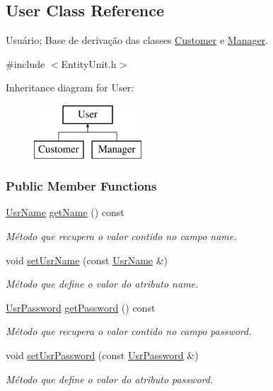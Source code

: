 \hypertarget{classUser}{\subsection{User Class Reference}
\label{d9/dc0/classUser}
}


Usuário; Base de derivação das classes \hyperlink{classCustomer}{Customer} e \hyperlink{classManager}{Manager}.  




{\ttfamily \#include $<$Entity\-Unit.\-h$>$}

Inheritance diagram for User\-:\begin{figure}[H]
\begin{center}
\leavevmode
\includegraphics[height=2.000000cm]{d9/dc0/classUser}
\end{center}
\end{figure}
\subsubsection*{Public Member Functions}
\begin{DoxyCompactItemize}
\item 
\hyperlink{classUsrName}{Usr\-Name} \hyperlink{classUser_ae1dd9bb1a02ea1aa4246da19c28cd831}{get\-Name} () const 
\begin{DoxyCompactList}\small\item\em Método que recupera o valor contido no campo name. \end{DoxyCompactList}\item 
void \hyperlink{classUser_ac20aab332b1debfd3b94aa4fb7825b07}{set\-Usr\-Name} (const \hyperlink{classUsrName}{Usr\-Name} \&)
\begin{DoxyCompactList}\small\item\em Método que define o valor do atributo name. \end{DoxyCompactList}\item 
\hyperlink{classUsrPassword}{Usr\-Password} \hyperlink{classUser_a799c61fc6ff206a1b1edbc86d61989ed}{get\-Password} () const 
\begin{DoxyCompactList}\small\item\em Método que recupera o valor contido no campo password. \end{DoxyCompactList}\item 
void \hyperlink{classUser_ad36ece3d4decfd7f3db7f15c96eec99b}{set\-Usr\-Password} (const \hyperlink{classUsrPassword}{Usr\-Password} \&)
\begin{DoxyCompactList}\small\item\em Método que define o valor do atributo password. \end{DoxyCompactList}\end{DoxyCompactItemize}
